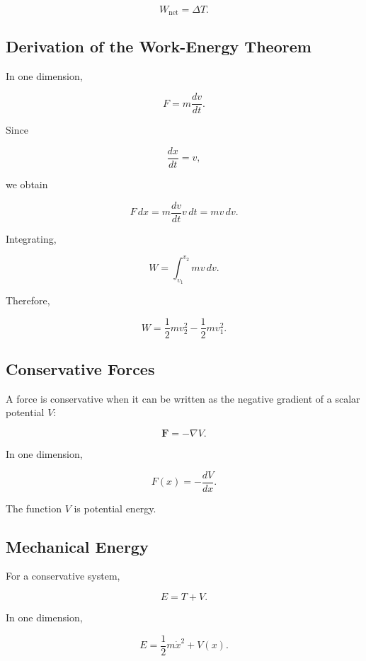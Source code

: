 \[
\boxed{
W_{\text{net}}
=
\Delta T.
}
\]

\subsection{Derivation of the Work-Energy Theorem}
\label{subsec:work-energy-derivation}

In one dimension,

\[
F
=
m\frac{dv}{dt}.
\]

Since

\[
\frac{dx}{dt}
=
v,
\]

we obtain

\[
F\,dx
=
m\frac{dv}{dt}v\,dt
=
mv\,dv.
\]

Integrating,

\[
W
=
\int_{v_1}^{v_2}
mv\,dv.
\]

Therefore,

\[
\boxed{
W
=
\frac12mv_2^2
-
\frac12mv_1^2.
}
\]

\subsection{Conservative Forces}
\label{subsec:conservative-forces}

A force is conservative when it can be written as the negative gradient of
a scalar potential \(V\):

\[
\boxed{
\mathbf{F}
=
-\nabla V.
}
\]

In one dimension,

\[
\boxed{
F(x)
=
-\frac{dV}{dx}.
}
\]

The function \(V\) is potential energy.

\subsection{Mechanical Energy}
\label{subsec:mechanical-energy}

For a conservative system,

\[
\boxed{
E
=
T+V.
}
\]

In one dimension,

\[
E
=
\frac12m\dot{x}^2
+
V(x).
\]

